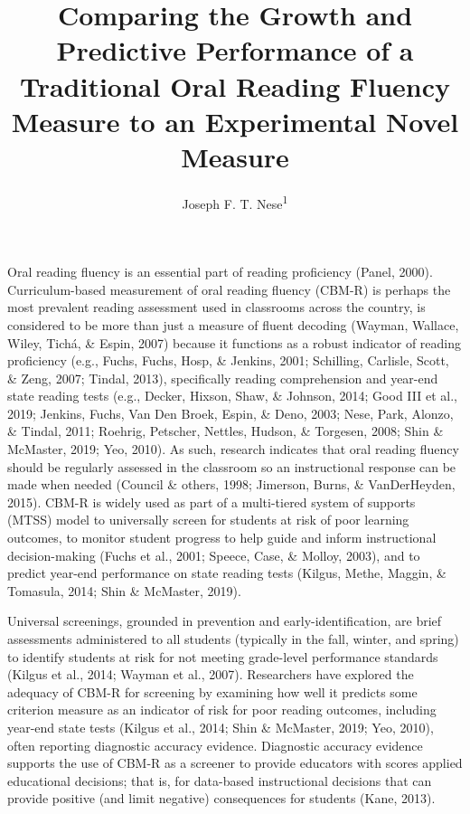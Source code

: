 \documentclass[
  english,
  man, fleqn, noextraspace]{apa6}
\title{Comparing the Growth and Predictive Performance of a Traditional Oral Reading Fluency Measure to an Experimental Novel Measure}
\author{Joseph F. T. Nese\textsuperscript{1}}
\date{}
\affiliation{\vspace{0.5cm}\textsuperscript{1} University of Oregon}
\begin{document}
\maketitle

Oral reading fluency is an essential part of reading proficiency (Panel, 2000). Curriculum-based measurement of oral reading fluency (CBM-R) is perhaps the most prevalent reading assessment used in classrooms across the country, is considered to be more than just a measure of fluent decoding (Wayman, Wallace, Wiley, Tichá, \& Espin, 2007) because it functions as a robust indicator of reading proficiency (e.g., Fuchs, Fuchs, Hosp, \& Jenkins, 2001; Schilling, Carlisle, Scott, \& Zeng, 2007; Tindal, 2013), specifically reading comprehension and year-end state reading tests (e.g., Decker, Hixson, Shaw, \& Johnson, 2014; Good III et al., 2019; Jenkins, Fuchs, Van Den Broek, Espin, \& Deno, 2003; Nese, Park, Alonzo, \& Tindal, 2011; Roehrig, Petscher, Nettles, Hudson, \& Torgesen, 2008; Shin \& McMaster, 2019; Yeo, 2010). As such, research indicates that oral reading fluency should be regularly assessed in the classroom so an instructional response can be made when needed (Council \& others, 1998; Jimerson, Burns, \& VanDerHeyden, 2015). CBM-R is widely used as part of a multi-tiered system of supports (MTSS) model to universally screen for students at risk of poor learning outcomes, to monitor student progress to help guide and inform instructional decision-making (Fuchs et al., 2001; Speece, Case, \& Molloy, 2003), and to predict year-end performance on state reading tests (Kilgus, Methe, Maggin, \& Tomasula, 2014; Shin \& McMaster, 2019).

Universal screenings, grounded in prevention and early-identification, are brief assessments administered to all students (typically in the fall, winter, and spring) to identify students at risk for not meeting grade-level performance standards (Kilgus et al., 2014; Wayman et al., 2007). Researchers have explored the adequacy of CBM-R for screening by examining how well it predicts some criterion measure as an indicator of risk for poor reading outcomes, including year-end state tests (Kilgus et al., 2014; Shin \& McMaster, 2019; Yeo, 2010), often reporting diagnostic accuracy evidence. Diagnostic accuracy evidence supports the use of CBM-R as a screener to provide educators with scores applied educational decisions; that is, for data-based instructional decisions that can provide positive (and limit negative) consequences for students (Kane, 2013).
\end{document}
